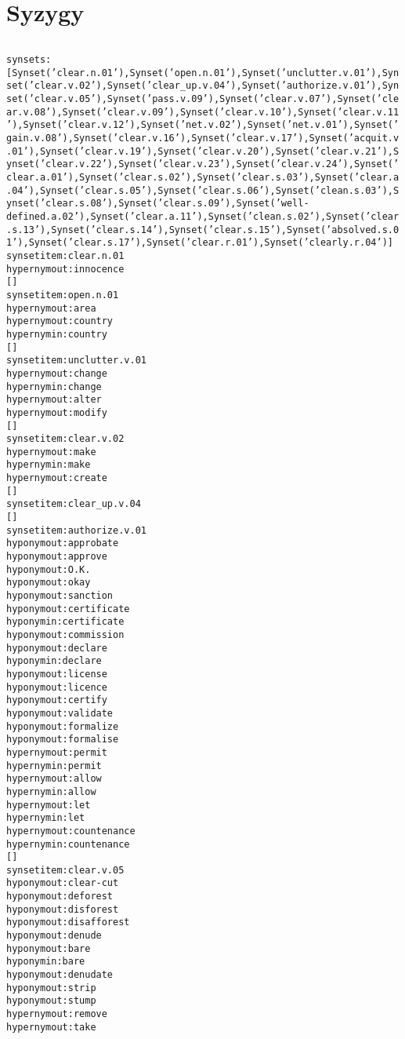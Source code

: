 \section{Syzygy}

\inputminted[firstline=81,lastline=107]{python}{back/code/textsurfer.py}
% 

\begin{alltt}
synsets:
[Synset('clear.n.01'), Synset('open.n.01'), Synset('unclutter.v.01'), Synset('clear.v.02'), Synset('clear_up.v.04'), Synset('authorize.v.01'), Synset('clear.v.05'), Synset('pass.v.09'), Synset('clear.v.07'), Synset('clear.v.08'), Synset('clear.v.09'), Synset('clear.v.10'), Synset('clear.v.11'), Synset('clear.v.12'), Synset('net.v.02'), Synset('net.v.01'), Synset('gain.v.08'), Synset('clear.v.16'), Synset('clear.v.17'), Synset('acquit.v.01'), Synset('clear.v.19'), Synset('clear.v.20'), Synset('clear.v.21'), Synset('clear.v.22'), Synset('clear.v.23'), Synset('clear.v.24'), Synset('clear.a.01'), Synset('clear.s.02'), Synset('clear.s.03'), Synset('clear.a.04'), Synset('clear.s.05'), Synset('clear.s.06'), Synset('clean.s.03'), Synset('clear.s.08'), Synset('clear.s.09'), Synset('well-defined.a.02'), Synset('clear.a.11'), Synset('clean.s.02'), Synset('clear.s.13'), Synset('clear.s.14'), Synset('clear.s.15'), Synset('absolved.s.01'), Synset('clear.s.17'), Synset('clear.r.01'), Synset('clearly.r.04')]% chktex 36
synset item:clear.n.01
hypernym out:innocence
[]
synset item:open.n.01
hypernym out:area
hypernym out:country
hypernym in:country
[]
synset item:unclutter.v.01
hypernym out:change
hypernym in:change
hypernym out:alter
hypernym out:modify
[]
synset item:clear.v.02
hypernym out:make
hypernym in:make
hypernym out:create
[]
synset item:clear_up.v.04
[]
synset item:authorize.v.01
hyponym out:approbate
hyponym out:approve
hyponym out:O.K.
hyponym out:okay
hyponym out:sanction
hyponym out:certificate
hyponym in:certificate
hyponym out:commission
hyponym out:declare
hyponym in:declare
hyponym out:license
hyponym out:licence
hyponym out:certify
hyponym out:validate
hyponym out:formalize
hyponym out:formalise
hypernym out:permit
hypernym in:permit
hypernym out:allow
hypernym in:allow
hypernym out:let
hypernym in:let
hypernym out:countenance
hypernym in:countenance
[]
synset item:clear.v.05
hyponym out:clear-cut
hyponym out:deforest
hyponym out:disforest
hyponym out:disafforest
hyponym out:denude
hyponym out:bare
hyponym in:bare
hyponym out:denudate
hyponym out:strip
hyponym out:stump
hypernym out:remove
hypernym out:take

\end{alltt}

